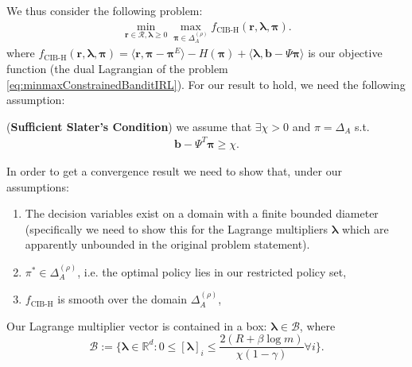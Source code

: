 We thus consider the following problem:
\begin{equation}
    \label{eq:dualConstrainedBanditIRLShannon}
    \begin{aligned}
        \min_{\bm{r}\in\mathcal{R},\bm{\lambda} \geq 0}\max_{\bm{\pi}\in\Delta_{A}^{(\rho)}} f_\text{CIB-H}(\bm{r},\bm{\lambda},\bm{\pi}).
    \end{aligned}
\end{equation}
where $f_\text{CIB-H}(\bm{r},\bm{\lambda},\bm{\pi}) = \langle \bm{r}, \bm{\pi}-\bm{\pi}^E\rangle - H(\bm{\pi}) + \langle \bm{\lambda}, \bm{b}-\Psi \bm{\pi} \rangle$ is our objective function (the dual Lagrangian of the problem \ref{eq:minmaxConstrainedBanditIRL}). For our result to hold, we need the following assumption:
\begin{assumption}
    \label{assumption:slater_with_margin_bandit}
    (\textbf{Sufficient Slater's Condition}) we assume that $\exists \chi > 0$ and $\pi = \Delta_A$ s.t.
    \begin{align*}
        \bm{b} - \Psi^T \bm{\pi} \geq \chi.
    \end{align*}
\end{assumption}
\noindent
In order to get a convergence result we need to show that, under our assumptions:
\begin{enumerate}
    \item The decision variables exist on a domain with a finite bounded diameter (specifically we need to show this for the Lagrange multipliers $\bm{\lambda}$ which are apparently unbounded in the original problem statement).
    \item $\pi^* \in \Delta_{A}^{(\rho)}$, i.e. the optimal policy lies in our restricted policy set,
    \item $f_\text{CIB-H}$ is smooth over the domain $\Delta_{A}^{(\rho)}$,
\end{enumerate}


\begin{proposition}
    \label{prop:bounded_zeta} Our Lagrange multiplier vector is contained in a box: $\bm{\lambda} \in \mathcal{B}$, where 
    \[ \mathcal{B} := \Bigg\{ \bm{\lambda}\in\mathbb{R}^d : 0\leq[\bm{\lambda}]_i  \leq \frac{2(R +\beta \log m)}{\chi (1-\gamma)} \forall i \Bigg\}.\]
\end{proposition}

